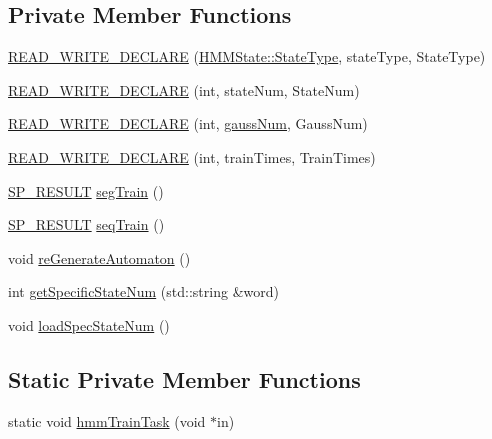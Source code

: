 \subsection*{Private Member Functions}
\begin{DoxyCompactItemize}
\item 
\hyperlink{class_h_m_m_automaton_set_a9bf2f84215b32d9f06c01842281f3456}{R\+E\+A\+D\+\_\+\+W\+R\+I\+T\+E\+\_\+\+D\+E\+C\+L\+A\+R\+E} (\hyperlink{class_h_m_m_state_a35d2a059c2410a52110329b637940046}{H\+M\+M\+State\+::\+State\+Type}, state\+Type, State\+Type)
\item 
\hyperlink{class_h_m_m_automaton_set_a5e94ca0c9729d121d3d71f5c138545c5}{R\+E\+A\+D\+\_\+\+W\+R\+I\+T\+E\+\_\+\+D\+E\+C\+L\+A\+R\+E} (int, state\+Num, State\+Num)
\item 
\hyperlink{class_h_m_m_automaton_set_a8a9ab8c64dbcb951066c136e594a3264}{R\+E\+A\+D\+\_\+\+W\+R\+I\+T\+E\+\_\+\+D\+E\+C\+L\+A\+R\+E} (int, \hyperlink{pro6__demo_8cpp_a923ffcfa3c56ccdba17bc4e700247d54}{gauss\+Num}, Gauss\+Num)
\item 
\hyperlink{class_h_m_m_automaton_set_a3dd92ba92d23d98952e0aea2cdbaef62}{R\+E\+A\+D\+\_\+\+W\+R\+I\+T\+E\+\_\+\+D\+E\+C\+L\+A\+R\+E} (int, train\+Times, Train\+Times)
\item 
\hyperlink{tool_8h_ab71a1f2fb85a32402ced5c483105b38e}{S\+P\+\_\+\+R\+E\+S\+U\+L\+T} \hyperlink{class_h_m_m_automaton_set_a616de9df965bbe999c765dcba59462c2}{seg\+Train} ()
\item 
\hyperlink{tool_8h_ab71a1f2fb85a32402ced5c483105b38e}{S\+P\+\_\+\+R\+E\+S\+U\+L\+T} \hyperlink{class_h_m_m_automaton_set_a29d9294858a9b964c9a906a8ed3cdee9}{seq\+Train} ()
\item 
void \hyperlink{class_h_m_m_automaton_set_a7130ce49809a0619d22ea31c8c35d3a6}{re\+Generate\+Automaton} ()
\item 
int \hyperlink{class_h_m_m_automaton_set_a6dd647c4d4e12f8b59be24b0d1aecd92}{get\+Specific\+State\+Num} (std\+::string \&word)
\item 
void \hyperlink{class_h_m_m_automaton_set_a44d6f56952334fe1c94751e7db25f65e}{load\+Spec\+State\+Num} ()
\end{DoxyCompactItemize}
\subsection*{Static Private Member Functions}
\begin{DoxyCompactItemize}
\item 
static void \hyperlink{class_h_m_m_automaton_set_a57dd811742567de33a326709435b15bd}{hmm\+Train\+Task} (void $\ast$in)
\end{DoxyCompactItemize}
